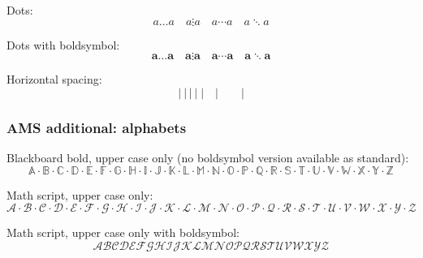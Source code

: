 \documentclass[12pt,a4paper]{article}
\theoremstyle{clearprint}
\begin{document}
\noindent 
Dots:
\begin{equation}
a \ldots a \quad a \vdots a \quad  a \cdots a \quad  a \ddots a
\end{equation}

\noindent 
Dots with boldsymbol:
\begin{equation}
\boldsymbol{a \ldots a \quad a \vdots a \quad  a \cdots a \quad  a \ddots a}
\end{equation}

\noindent 
Horizontal spacing:
\begin{equation}
|~|\,|\:|\;|\quad | \qquad |
\end{equation}


\subsubsection[AMS alphabets]{AMS additional: alphabets}

\noindent 
Blackboard bold, upper case only (no boldsymbol version available as standard):
\begin{equation}
\mathbb{A} \cdot \mathbb{B} \cdot \mathbb{C} \cdot \mathbb{D} \cdot \mathbb{E} \cdot \mathbb{F} \cdot \mathbb{G} \cdot \mathbb{H} \cdot \mathbb{I} \cdot \mathbb{J} \cdot \mathbb{K} \cdot \mathbb{L} \cdot \mathbb{M} \cdot \mathbb{N} \cdot \mathbb{O} \cdot \mathbb{P} \cdot \mathbb{Q} \cdot \mathbb{R} \cdot \mathbb{S} \cdot \mathbb{T} \cdot \mathbb{U} \cdot \mathbb{V} \cdot \mathbb{W} \cdot \mathbb{X} \cdot \mathbb{Y} \cdot \mathbb{Z}
\end{equation}

\noindent
Math script, upper case only:
\begin{equation}
\mathscr{A} \cdot \mathscr{B} \cdot \mathscr{C} \cdot \mathscr{D} \cdot \mathscr{E} \cdot \mathscr{F} \cdot \mathscr{G} \cdot \mathscr{H} \cdot \mathscr{I} \cdot \mathscr{J} \cdot \mathscr{K} \cdot \mathscr{L} \cdot \mathscr{M} \cdot \mathscr{N} \cdot \mathscr{O} \cdot \mathscr{P} \cdot \mathscr{Q} \cdot \mathscr{R} \cdot \mathscr{S} \cdot \mathscr{T} \cdot \mathscr{U} \cdot \mathscr{V} \cdot \mathscr{W} \cdot \mathscr{X} \cdot \mathscr{Y} \cdot \mathscr{Z}
\end{equation}

\noindent
Math script, upper case only with boldsymbol:
\begin{equation}
\boldsymbol{\mathscr{A}  \mathscr{B}  \mathscr{C}  \mathscr{D}  \mathscr{E}  \mathscr{F}  \mathscr{G}  \mathscr{H}  \mathscr{I}  \mathscr{J}  \mathscr{K}  \mathscr{L}  \mathscr{M}  \mathscr{N}  \mathscr{O}  \mathscr{P}  \mathscr{Q}  \mathscr{R}  \mathscr{S}  \mathscr{T}  \mathscr{U}  \mathscr{V}  \mathscr{W}  \mathscr{X}  \mathscr{Y}  \mathscr{Z}}
\end{equation}
\end{document}
